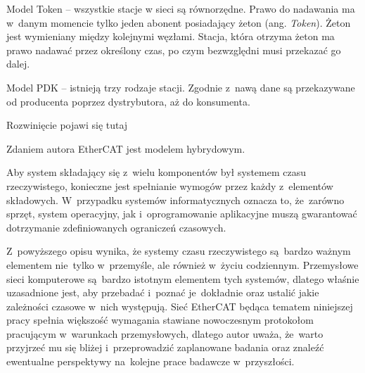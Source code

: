 Model Token -- wszystkie stacje w sieci są równorzędne. Prawo do nadawania ma w~danym momencie tylko jeden abonent posiadający żeton (ang. \textit{Token}). Żeton jest wymieniany między kolejnymi węzłami. Stacja, która otrzyma żeton ma prawo nadawać przez określony czas, po czym bezwzględni musi przekazać go dalej.

Model PDK -- istnieją trzy rodzaje stacji. Zgodnie z~nawą dane są przekazywane od producenta poprzez dystrybutora, aż do konsumenta.

\vspace{5mm}
Rozwinięcie pojawi się tutaj
\vspace{5mm}

Zdaniem autora EtherCAT jest modelem hybrydowym.

\clearpage
Aby system składający się z~wielu komponentów był systemem czasu rzeczywistego, konieczne jest spełnianie wymogów przez każdy z~elementów składowych. W~przypadku systemów informatycznych oznacza to, że~zarówno sprzęt, system operacyjny, jak i~oprogramowanie aplikacyjne muszą gwarantować dotrzymanie zdefiniowanych ograniczeń czasowych.

Z~powyższego opisu wynika, że systemy czasu rzeczywistego są~bardzo ważnym elementem nie~tylko w~przemyśle, ale również w~życiu codziennym. Przemysłowe sieci komputerowe są~bardzo istotnym elementem tych systemów, dlatego właśnie uzasadnione jest, aby przebadać i~poznać je~dokładnie oraz ustalić jakie zależności czasowe w~nich występują.
Sieć EtherCAT będąca tematem niniejszej pracy spełnia większość wymagania stawiane nowoczesnym protokołom pracującym w~warunkach przemysłowych, dlatego autor uważa, że~warto przyjrzeć mu się bliżej i~przeprowadzić zaplanowane badania oraz znaleźć ewentualne perspektywy na~kolejne prace badawcze w~przyszłości.
\clearpage
